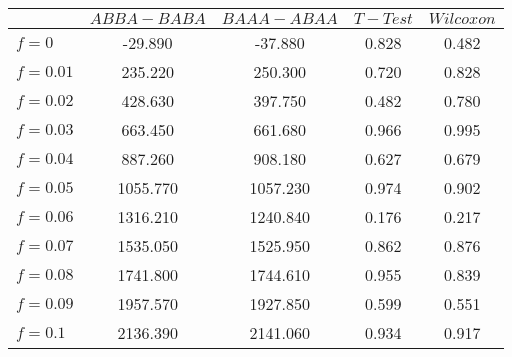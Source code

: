 \begin{tabular}{lcccc}
\toprule
 & $ABBA-BABA$ & $BAAA-ABAA$ & $T-Test$ & $Wilcoxon$ \\
\midrule
$f = 0$ & -29.890 & -37.880 & 0.828 & 0.482 \\
$f = 0.01$ & 235.220 & 250.300 & 0.720 & 0.828 \\
$f = 0.02$ & 428.630 & 397.750 & 0.482 & 0.780 \\
$f = 0.03$ & 663.450 & 661.680 & 0.966 & 0.995 \\
$f = 0.04$ & 887.260 & 908.180 & 0.627 & 0.679 \\
$f = 0.05$ & 1055.770 & 1057.230 & 0.974 & 0.902 \\
$f = 0.06$ & 1316.210 & 1240.840 & 0.176 & 0.217 \\
$f = 0.07$ & 1535.050 & 1525.950 & 0.862 & 0.876 \\
$f = 0.08$ & 1741.800 & 1744.610 & 0.955 & 0.839 \\
$f = 0.09$ & 1957.570 & 1927.850 & 0.599 & 0.551 \\
$f = 0.1$ & 2136.390 & 2141.060 & 0.934 & 0.917 \\
\bottomrule
\end{tabular}
